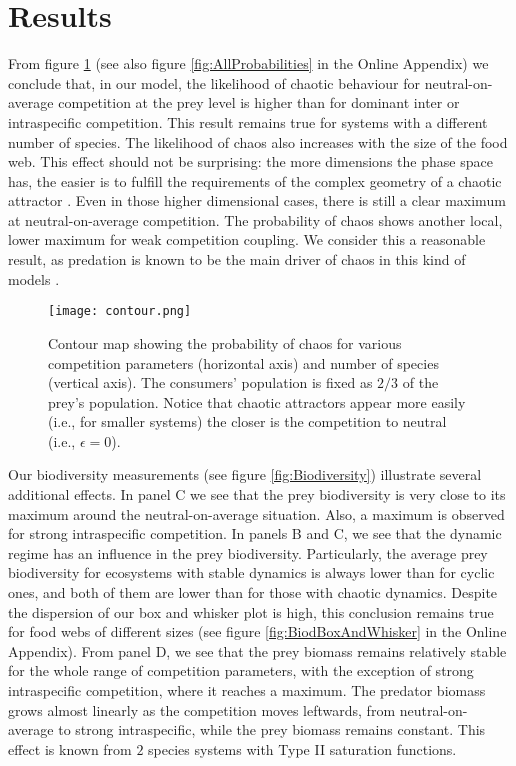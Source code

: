 \section{Results}
\label{sec:Results}
From figure \ref{fig:Contour} (see also figure \ref{fig:AllProbabilities} in the Online Appendix) we conclude that, in our model, the likelihood of chaotic behaviour for neutral-on-average competition at the prey level is higher than for dominant inter or intraspecific competition. This result remains true for systems with a different number of species. The likelihood of chaos also increases with the size of the food web. This effect should not be surprising: the more dimensions the phase space has, the easier is to fulfill the requirements of the complex geometry of a chaotic attractor \citep{Strogatz1994}. Even in those higher dimensional cases, there is still a clear maximum at neutral-on-average competition. The probability of chaos shows another local, lower maximum for weak competition coupling. We consider this a reasonable result, as predation is known to be the main driver of chaos in this kind of models \citep{Scheffer2004}.

\begin{figure}
	\begin{center}
		\texttt{[image: contour.png]}
	\end{center}
	\caption{Contour map showing the probability of chaos for various competition parameters (horizontal axis) and number of species (vertical axis). The consumers' population is fixed as $ 2/3 $ of the prey's population. Notice that chaotic attractors appear more easily (i.e., for smaller systems) the closer is the competition to neutral (i.e., $ \epsilon = 0 $).}
	\label{fig:Contour}
\end{figure}

Our biodiversity measurements (see figure \ref{fig:Biodiversity}) illustrate several additional effects. In panel C we see that the prey biodiversity is very close to its maximum around the neutral-on-average situation. Also, a maximum is observed for strong intraspecific competition. In panels B and C, we see that the dynamic regime has an influence in the prey biodiversity. Particularly, the average prey biodiversity for ecosystems with stable dynamics is always lower than for cyclic ones, and both of them are lower than for those with chaotic dynamics. Despite the dispersion of our box and whisker plot is high, this conclusion remains true for food webs of different sizes (see figure \ref{fig:BiodBoxAndWhisker} in the Online Appendix). From panel D, we see that the prey biomass remains relatively stable for the whole range of competition parameters, with the exception of strong intraspecific competition, where it reaches a maximum. The predator biomass grows almost linearly as the competition moves leftwards, from neutral-on-average to strong intraspecific, while the prey biomass remains constant. This effect is known from $ 2 $ species systems with Type II saturation functions.

